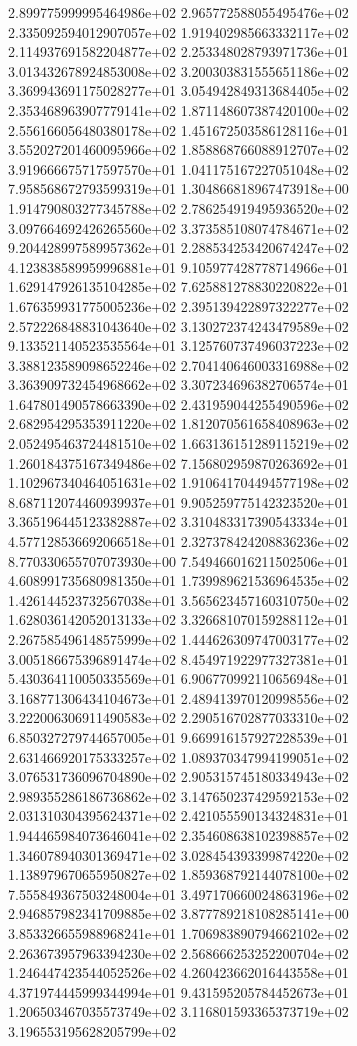 2.899775999995464986e+02 2.965772588055495476e+02 2.335092594012907057e+02
1.919402985663332117e+02 2.114937691582204877e+02 2.253348028793971736e+01
3.013432678924853008e+02 3.200303831555651186e+02 3.369943691175028277e+01
3.054942849313684405e+02 2.353468963907779141e+02 1.871148607387420100e+02
2.556166056480380178e+02 1.451672503586128116e+01 3.552027201460095966e+02
1.858868766088912707e+02 3.919666675717597570e+01 1.041175167227051048e+02
7.958568672793599319e+01 1.304866818967473918e+00 1.914790803277345788e+02
2.786254919495936520e+02 3.097664692426265560e+02 3.373585108074784671e+02
9.204428997589957362e+01 2.288534253420674247e+02 4.123838589959996881e+01
9.105977428778714966e+01 1.629147926135104285e+02 7.625881278830220822e+01
1.676359931775005236e+02 2.395139422897322277e+02 2.572226848831043640e+02
3.130272374243479589e+02 9.133521140523535564e+01 3.125760737496037223e+02
3.388123589098652246e+02 2.704140646003316988e+02 3.363909732454968662e+02
3.307234696382706574e+01 1.647801490578663390e+02 2.431959044255490596e+02
2.682954295353911220e+02 1.812070561658408963e+02 2.052495463724481510e+02
1.663136151289115219e+02 1.260184375167349486e+02 7.156802959870263692e+01
1.102967340464051631e+02 1.910641704494577198e+02 8.687112074460939937e+01
9.905259775142323520e+01 3.365196445123382887e+02 3.310483317390543334e+01
4.577128536692066518e+01 2.327378424208836236e+02 8.770330655707073930e+00
7.549466016211502506e+01 4.608991735680981350e+01 1.739989621536964535e+02
1.426144523732567038e+01 3.565623457160310750e+02 1.628036142052013133e+02
3.326681070159288112e+01 2.267585496148575999e+02 1.444626309747003177e+02
3.005186675396891474e+02 8.454971922977327381e+01 5.430364110050335569e+01
6.906770992110656948e+01 3.168771306434104673e+01 2.489413970120998556e+02
3.222006306911490583e+02 2.290516702877033310e+02 6.850327279744657005e+01
9.669916157927228539e+01 2.631466920175333257e+02 1.089370347994199051e+02
3.076531736096704890e+02 2.905315745180334943e+02 2.989355286186736862e+02
3.147650237429592153e+02 2.031310304395624371e+02 2.421055590134324831e+01
1.944465984073646041e+02 2.354608638102398857e+02 1.346078940301369471e+02
3.028454393399874220e+02 1.138979670655950827e+02 1.859368792144078100e+02
7.555849367503248004e+01 3.497170660024863196e+02 2.946857982341709885e+02
3.877789218108285141e+00 3.853326655988968241e+01 1.706983890794662102e+02
2.263673957963394230e+02 2.568666253252200704e+02 1.246447423544052526e+02
4.260423662016443558e+01 4.371974445999344994e+01 9.431595205784452673e+01
1.206503467035573749e+02 3.116801593365373719e+02 3.196553195628205799e+02
